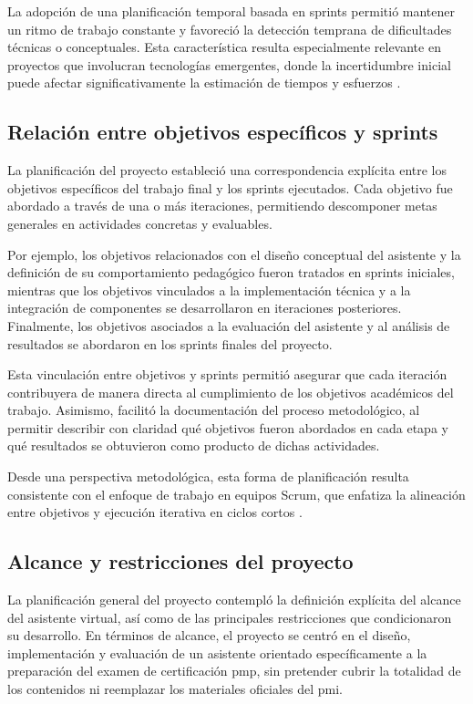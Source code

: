La adopción de una planificación temporal basada en sprints permitió mantener un ritmo de trabajo constante y favoreció la detección temprana de dificultades técnicas o conceptuales. Esta característica resulta especialmente relevante en proyectos que involucran tecnologías emergentes, donde la incertidumbre inicial puede afectar significativamente la estimación de tiempos y esfuerzos \parencite{dong2024agile, rath2025agile}.

\subsection{Relación entre objetivos específicos y sprints}

La planificación del proyecto estableció una correspondencia explícita entre los objetivos específicos del trabajo final y los sprints ejecutados. Cada objetivo fue abordado a través de una o más iteraciones, permitiendo descomponer metas generales en actividades concretas y evaluables.

Por ejemplo, los objetivos relacionados con el diseño conceptual del asistente y la definición de su comportamiento pedagógico fueron tratados en sprints iniciales, mientras que los objetivos vinculados a la implementación técnica y a la integración de componentes se desarrollaron en iteraciones posteriores. Finalmente, los objetivos asociados a la evaluación del asistente y al análisis de resultados se abordaron en los sprints finales del proyecto.

Esta vinculación entre objetivos y sprints permitió asegurar que cada iteración contribuyera de manera directa al cumplimiento de los objetivos académicos del trabajo. Asimismo, facilitó la documentación del proceso metodológico, al permitir describir con claridad qué objetivos fueron abordados en cada etapa y qué resultados se obtuvieron como producto de dichas actividades.

Desde una perspectiva metodológica, esta forma de planificación resulta consistente con el enfoque de trabajo en equipos Scrum, que enfatiza la alineación entre objetivos y ejecución iterativa en ciclos cortos \parencite{verwijs2023scrum}.

\subsection{Alcance y restricciones del proyecto}

La planificación general del proyecto contempló la definición explícita del alcance del asistente virtual, así como de las principales restricciones que condicionaron su desarrollo. En términos de alcance, el proyecto se centró en el diseño, implementación y evaluación de un asistente orientado específicamente a la preparación del examen de certificación \gls{pmp}, sin pretender cubrir la totalidad de los contenidos ni reemplazar los materiales oficiales del \gls{pmi}.

